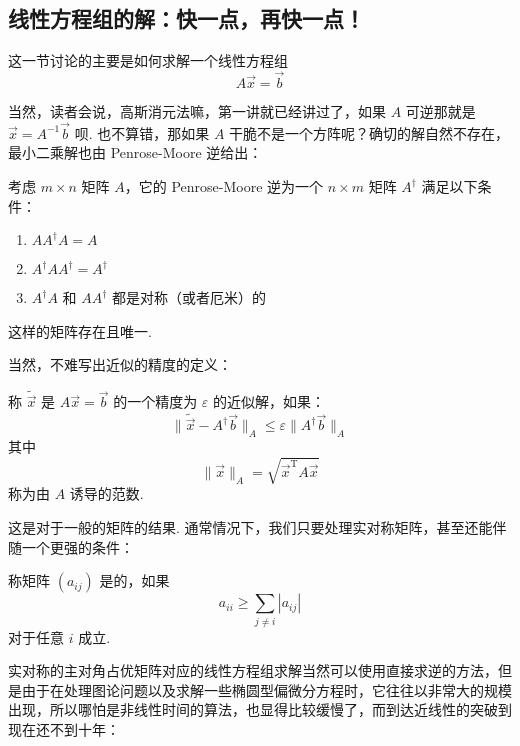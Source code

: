 \subsection{线性方程组的解：快一点，再快一点！}

这一节讨论的主要是如何求解一个线性方程组
\[ A\vec{x} = \vec{b} \]

当然，读者会说，高斯消元法嘛，第一讲就已经讲过了，如果 $A$ 可逆那就是 $\vec{x} = A^{-1}\vec{b}$ 呗. 也不算错，那如果 $A$ 干脆不是一个方阵呢？确切的解自然不存在，最小二乘解也由 Penrose-Moore 逆给出：

\begin{definition}
    考虑 $m \times n$ 矩阵 $A$，它的 Penrose-Moore 逆为一个 $n \times m$ 矩阵 $A^\dagger$ 满足以下条件：

    \begin{enumerate}
        \item $A A^\dagger A = A$

        \item $A^\dagger A A^\dagger = A^\dagger$

        \item $A^\dagger A$ 和 $AA^\dagger$ 都是对称（或者厄米）的
    \end{enumerate}

    这样的矩阵存在且唯一.
\end{definition}

当然，不难写出近似的精度的定义：

\begin{definition}
    称 $\widetilde{\vec{x}}$ 是 $A\vec{x} = \vec{b}$ 的一个精度为 $\varepsilon$ 的近似解，如果：
    \[ \lVert \widetilde{\vec{x}} - A^\dagger \vec{b} \rVert_A \leqslant \varepsilon \lVert A^\dagger \vec{b} \rVert_A \]
    其中
    \[ \lVert \vec{x} \rVert_A = \sqrt{\vec{x}^\mathrm{T}A\vec{x}} \]
    称为由 $A$ 诱导的范数.
\end{definition}

这是对于一般的矩阵的结果. 通常情况下，我们只要处理实对称矩阵，甚至还能伴随一个更强的条件：

\begin{definition} 
    称矩阵 $(a_{ij})$ 是的，如果
    \[ a_{ii} \geqslant \sum_{j \neq i} |a_{ij}| \]
    对于任意 $i$ 成立.
\end{definition}

实对称的主对角占优矩阵对应的线性方程组求解当然可以使用直接求逆的方法，但是由于在处理图论问题以及求解一些椭圆型偏微分方程时，它往往以非常大的规模出现，所以哪怕是非线性时间的算法，也显得比较缓慢了，而到达近线性的突破到现在还不到十年：

